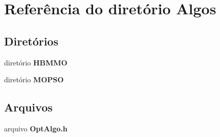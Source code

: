 \section{Referência do diretório Algos}
\label{dir_d753cb59b002401abd4f4217671afb9d}
\subsection*{Diretórios}
\begin{DoxyCompactItemize}
\item 
diretório {\bf H\+B\+M\+MO}
\item 
diretório {\bf M\+O\+P\+SO}
\end{DoxyCompactItemize}
\subsection*{Arquivos}
\begin{DoxyCompactItemize}
\item 
arquivo {\bf Opt\+Algo.\+h}
\end{DoxyCompactItemize}
